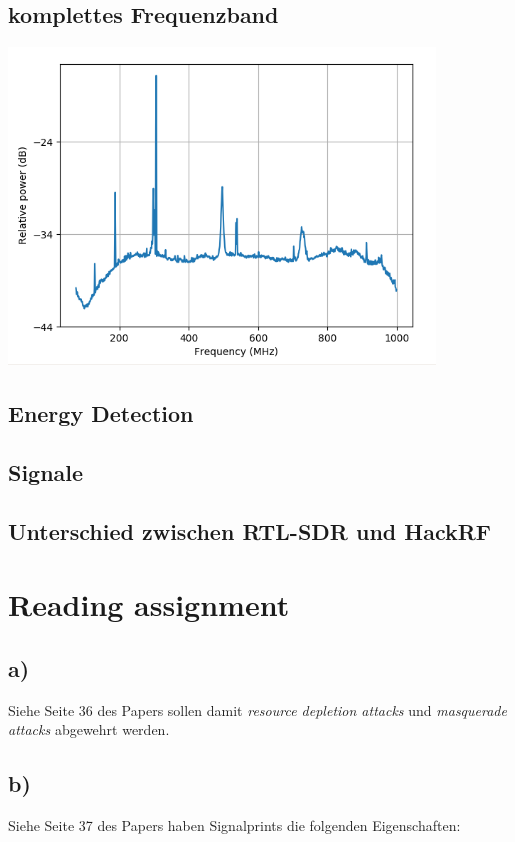 \documentclass[12pt,a4paper]{article}
\begin{document}
\subsection{komplettes Frequenzband}
\includegraphics[width=0.85\textwidth ]{Bilder/A3_full_frequency_band.png}

\subsection{Energy Detection}

\subsection{Signale}

\subsection{Unterschied zwischen RTL-SDR und HackRF}

\newpage
\section{Reading assignment}

\subsection{a)} 
Siehe Seite 36 des Papers sollen damit \textit{resource 
depletion attacks} und \textit{masquerade attacks} 
abgewehrt werden.


\subsection{b)} 
Siehe Seite 37 des Papers haben Signalprints die folgenden 
Eigenschaften:
\end{document}
